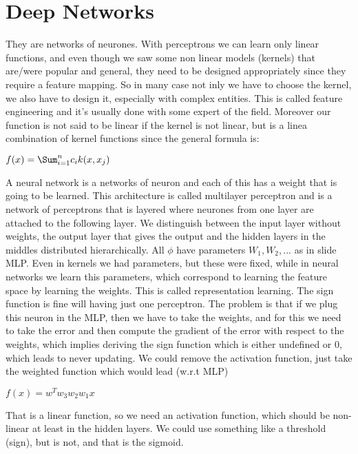 \chapter{Deep Networks}
They are networks of neurones. With perceptrons we can learn only linear functions, and even though we saw some non linear models (kernels) that are/were popular and general, they need to be designed appropriately since they require a feature mapping. So in many case not inly we have to choose the kernel, we also have to design it, especially with complex entities. This is called feature engineering and it's usually done with some expert of the field. Moreover our function is not said to be linear if the kernel is not linear, but is a linea combination of kernel functions since the general formula is:
\begin{center}
	$\displaystyle f(x)=\Sum_{i=1}^nc_ik(x,x_j)$
\end{center}
A neural network is a networks of neuron and each of this has a weight that is going to be learned. This architecture is called multilayer perceptron and is a network of perceptrons that is layered where neurones from one layer are attached to the following layer. We distinguish between the input layer without weights, the output layer that gives the output and the hidden layers in the middles distributed hierarchically. \newline
All $\phi$ have parameters $W_1, W_2, ...$ as in slide MLP. Even in kernels we had parameters, but these were fixed, while in neural networks we learn this parameters, which correspond to learning the feature space by learning the weights. This is called representation learning.\newline
The sign function is fine will having just one perceptron. The problem is that if we plug this neuron in the MLP, then we have to take the weights, and for this we need to take the error and then compute the gradient of the error with respect to the weights, which implies deriving the sign function which is either undefined or 0, which leads to never updating. \newline
We could remove the activation function, just take the weighted function which would lead (w.r.t MLP)
\begin{center}
	$\displaystyle f(x)=w^Tw_3w_2w_1x$
\end{center}
That is a linear function, so we need an activation function, which should be non-linear at least in the hidden layers. \newline
We could use something like a threshold (sign), but is not, and that is the sigmoid. 

